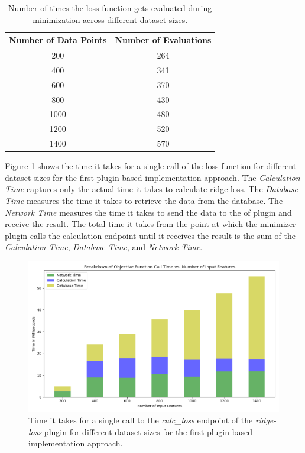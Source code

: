 \documentclass[
  a4paper,  %
  twoside,  %
  bibliography=totoc,
  headsepline,
  cleardoublepage=empty,
  parskip=half,
  draft=false
]{scrbook}
\begin{document}
\begin{table}[h!]
  \centering
  \begin{tabular}{cc}
  \toprule
  \textbf{Number of Data Points} & \textbf{Number of Evaluations} \\
  \midrule
  200 & 264 \\
  400 & 341 \\
  600 & 370 \\
  800 & 430 \\
  1000 & 480 \\
  1200 & 520 \\
  1400 & 570 \\
  \bottomrule
  \end{tabular}
  \caption{Number of times the loss function gets evaluated during minimization across different dataset sizes.}
  \label{table:of_calls}
\end{table}

Figure \ref{fig:of_call_time_version1} shows the time it takes for a single call of the loss function for different dataset sizes for the first plugin-based implementation approach.
The \emph{Calculation Time} captures only the actual time it takes to calculate ridge loss.
The \emph{Database Time} measures the time it takes to retrieve the data from the database.
The \emph{Network Time} measures the time it takes to send the data to the \gls{of} plugin and receive the result.
The total time it takes from the point at which the minimizer plugin calls the calculation endpoint until it receives the result is the sum of the \emph{Calculation Time}, \emph{Database Time}, and \emph{Network Time}.

\begin{figure}
  \centering
  \includegraphics[width=\textwidth]{graphics/of_call_times_version1.png}
  \caption{Time it takes for a single call to the \emph{calc\_loss} endpoint of the \emph{ridge-loss} plugin for different dataset sizes for the first plugin-based implementation approach.}
  \label{fig:of_call_time_version1}
\end{figure}
\end{document}
